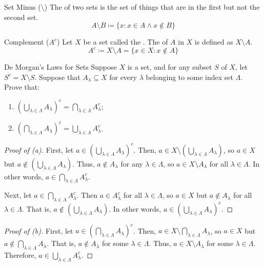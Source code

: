 \begin{dfnbox}{Set Minus ($\setminus$)}{}
    The  of two sets is the set of things that are in the first but not the second set.
    \tcblower
    \[ A \setminus B \coloneq \{ x : x \in A \land x \notin B \} \]
\end{dfnbox}

\begin{dfnbox}{Complement ($A^c$)}{}
    Let $X$ be a set called the . The  of $A$ in $X$ is defined as $X \setminus A$.
    \tcblower
    \[ A^c \coloneq X \setminus A = \{ x \in X : x \notin A \} \]
\end{dfnbox}

\begin{thmbox}{De Morgan's Laws for Sets}{}
    Suppose $X$ is a set, and for any subset $S$ of $X$, let $S^c = X \setminus S$. Suppose that $A_\lambda \subseteq X$ for every $\lambda$ belonging to some index set $\Lambda$. Prove that:
    \begin{enumerate}[label=(\alph*)]
        \item \( \left( \bigcup_{\lambda \in \Lambda} A_\lambda \right)^c = \bigcap_{\lambda \in \Lambda} A_\lambda^c \);
        \item \( \left( \bigcap_{\lambda \in \Lambda} A_\lambda \right)^c = \bigcup_{\lambda \in \Lambda}A_\lambda^c \).
    \end{enumerate}
    \tcblower
    \begin{proof}[Proof of (a)]
        First, let $a \in \left( \bigcup_{\lambda \in \Lambda} A_\lambda \right)^c$. Then, $a \in X \setminus \left( \bigcup_{\lambda \in \Lambda} A_\lambda \right)$, so $a \in X$ but $a \notin \left( \bigcup_{\lambda \in \Lambda} A_\lambda \right)$. Thus, $a \notin A_\lambda$ for any $\lambda \in \Lambda$, so $a \in X \setminus A_\lambda$ for all $\lambda \in \Lambda$. In other words, $a \in \bigcap_{\lambda \in \Lambda} A_\lambda^c$.

        Next, let $a \in \bigcap_{\lambda \in \Lambda} A_\lambda^c$. Then $a \in A_\lambda^c$ for all $\lambda \in \Lambda$, so $a \in X$ but $a \notin A_\lambda$ for all $\lambda \in \Lambda$. That is, $a \notin \left( \bigcup_{\lambda\in\Lambda} A_\lambda \right)$. In other words, $a \in \left( \bigcup_{\lambda\in\Lambda} A_\lambda \right) ^ c$.
    \end{proof}

    \begin{proof}[Proof of (b)]
        First, let $a \in \left( \bigcap_{\lambda \in \Lambda} A_\lambda \right)^c$. Then, $a \in X \setminus  \bigcap_{\lambda \in \Lambda} A_\lambda$, so $a \in X$ but $a \notin \bigcap_{\lambda \in \Lambda} A_\lambda$. That is, $a \notin A_\lambda$ for some $\lambda \in \Lambda$. Thus, $a \in X \setminus A_\lambda$ for some $\lambda \in \Lambda$. Therefore, $a \in \bigcup_{\lambda \in \Lambda} A_\lambda^c$.


\end{proof}
\end{thmbox}
